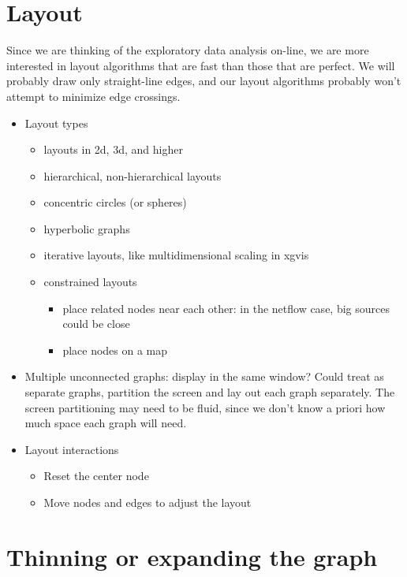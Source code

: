 \documentclass[11pt]{article}
\begin{document}
\section{Layout}

Since we are thinking of the exploratory data analysis on-line,
we are more interested in layout algorithms that are fast than
those that are perfect.  We will probably draw only straight-line
edges, and our layout algorithms probably won't attempt to minimize
edge crossings.


\begin{itemize} \itemsep 0em
\item Layout types
   \begin{itemize} \itemsep 0em
   \item layouts in 2d, 3d, and higher
   \item hierarchical, non-hierarchical layouts
   \item concentric circles (or spheres)
   \item hyperbolic graphs
   \item iterative layouts, like multidimensional scaling in xgvis

   \item constrained layouts
     \begin{itemize} \itemsep 0em
     \item place related nodes near each other: in the
           netflow case, big sources could be close
     \item place nodes on a map
     \end{itemize}
   \end{itemize}

 \item Multiple unconnected graphs: display in the same window?
   Could treat as separate graphs, partition the screen and lay
   out each graph separately.  The screen partitioning may need
   to be fluid, since we don't know a priori how much space each
   graph will need.

 \item Layout interactions
   \begin{itemize} \itemsep 0em
   \item Reset the center node 
   \item Move nodes and edges to adjust the layout
   \end{itemize}

\end{itemize}

\section{Thinning or expanding the graph}
\end{document}
